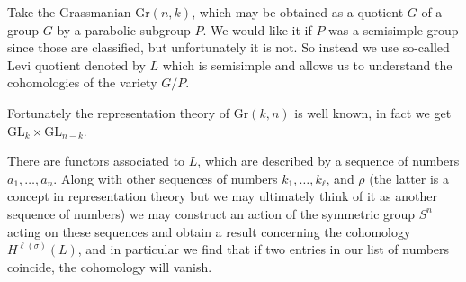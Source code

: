 Take the Grassmanian $\text{Gr}(n,k)$, which may be obtained as a quotient $G$
of a group $G$ by a parabolic subgroup $P$. We would like it if $P$ was a
semisimple group since those are classified, but unfortunately it is not. 
So instead we use so-called Levi quotient denoted by $L$ which is semisimple
and allows us to understand the cohomologies of the variety $G/P$.

Fortunately the representation theory of $\text{Gr}(k,n)$ is well known, in fact
we get $\text{GL}_k \times \text{GL}_{n-k}$.

There are functors associated to $L$, which are described by a sequence of
numbers $a_1,\ldots,a_n$. Along with other sequences of numbers
$k_1,\ldots,k_\ell$, and $\rho$ (the latter is a concept in representation
theory but we may ultimately think of it as another sequence of numbers) we may
construct an action of the symmetric group $S^n$ acting on these sequences and
obtain a result concerning the cohomology $H^{\ell(\sigma)}(L)$, and in
particular we find that if two entries in our list of numbers coincide, the
cohomology will vanish.







